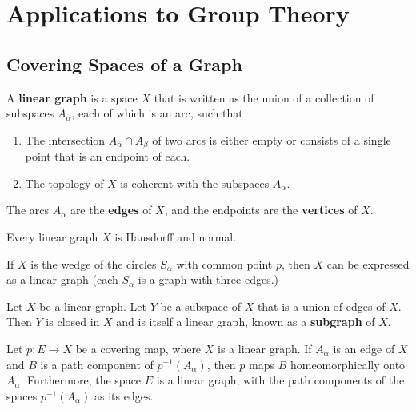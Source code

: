 \section{Applications to Group Theory}

\setcounter{subsection}{82}
\subsection{Covering Spaces of a Graph}

\begin{definition}
A \textbf{linear graph} is a space $X$ that is written as the union of a collection of subspaces $A_\alpha$, each of which is an arc, such that
\begin{enumerate}[1)]
    \item The intersection $A_\alpha \cap A_\beta$ of two arcs is either empty or consists of a single point that is an endpoint of each.
    \item The topology of $X$ is coherent with the subspaces $A_\alpha$.
\end{enumerate}
The arcs $A_\alpha$ are the \textbf{edges} of $X$, and the endpoints are the \textbf{vertices} of $X$.
\end{definition}

\begin{lemma}
Every linear graph $X$ is Hausdorff and normal.
\end{lemma}

\begin{eg}
If $X$ is the wedge of the circles $S_\alpha$ with common point $p$, then $X$ can be expressed as a linear graph (each $S_\alpha$ is a graph with three edges.)
\end{eg}

\begin{definition}[Subgraph]
Let $X$ be a linear graph. Let $Y$ be a subspace of $X$ that is a union of edges of $X$. Then $Y$ is closed in $X$ and is itself a linear graph, known as a \textbf{subgraph} of $X$.
\end{definition}

\begin{theorem*}[83.4]
Let $p\colon E \rightarrow  X$ be a covering map, where $X$ is a linear graph. If $A_\alpha$ is an edge of $X$ and $B$ is a path component of $p^{-1}(A_\alpha)$, then $p$ maps $B$ homeomorphically
onto $A_\alpha$. Furthermore, the space $E$ is a linear graph, with the path components of the spaces $p^{-1}(A_\alpha)$ as its edges.
\end{theorem*}

